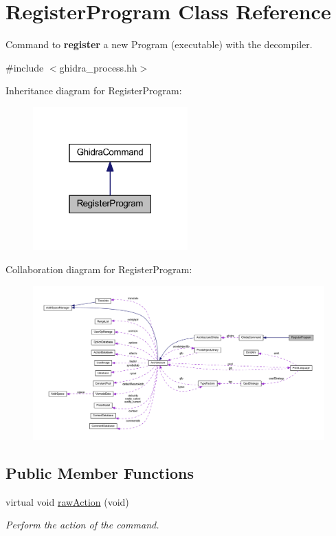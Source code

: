 \hypertarget{class_register_program}{}\section{Register\+Program Class Reference}
\label{class_register_program}


Command to {\bfseries{register}} a new Program (executable) with the decompiler.  




{\ttfamily \#include $<$ghidra\+\_\+process.\+hh$>$}



Inheritance diagram for Register\+Program\+:
\nopagebreak
\begin{figure}[H]
\begin{center}
\leavevmode
\includegraphics[width=169pt]{class_register_program__inherit__graph}
\end{center}
\end{figure}


Collaboration diagram for Register\+Program\+:
\nopagebreak
\begin{figure}[H]
\begin{center}
\leavevmode
\includegraphics[width=350pt]{class_register_program__coll__graph}
\end{center}
\end{figure}
\subsection*{Public Member Functions}
\begin{DoxyCompactItemize}
\item 
virtual void \mbox{\hyperlink{class_register_program_ae79c022fba3244f9969aa007058f4b53}{raw\+Action}} (void)
\begin{DoxyCompactList}\small\item\em Perform the action of the command. \end{DoxyCompactList}\end{DoxyCompactItemize}
